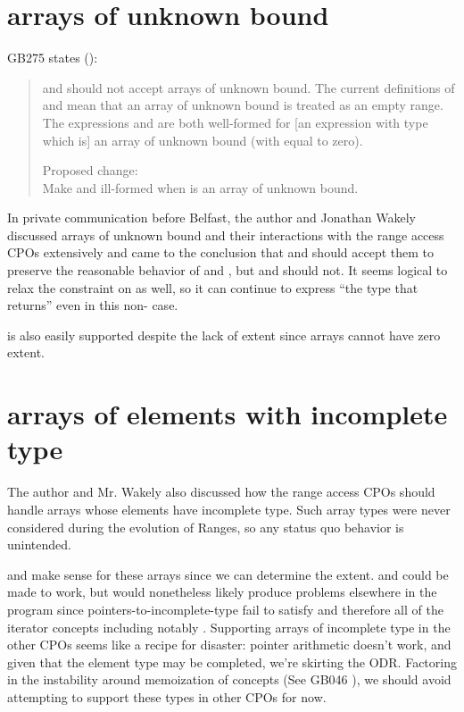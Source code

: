 \section{arrays of unknown bound}
GB275 states (\cite{GB275}):
\begin{quote}
 and  should not accept arrays of unknown bound.
The current definitions of  and 
mean that an array of unknown bound is treated as an empty range.
The expressions  and  are both well-formed
for [an expression  with type  which is] an array of unknown bound
(with  equal to zero).

Proposed change: \\
Make  and  ill-formed
when  is an array of unknown bound.
\end{quote}

In private communication before Belfast,
the author and Jonathan Wakely discussed arrays of unknown bound
and their interactions with the range access CPOs extensively
and came to the conclusion that
 and  should accept them
to preserve the reasonable behavior of  and ,
but  and  should not.
It seems logical to relax the  constraint on  as well,
so it can continue to express ``the type that  returns''
even in this non- case.

 is also easily supported
despite the lack of extent
since arrays cannot have zero extent.


\section{arrays of elements with incomplete type}

The author and Mr. Wakely also discussed
how the range access CPOs should handle
arrays whose elements have incomplete type.
Such array types were never considered during the evolution of Ranges,
so any status quo behavior is unintended.

 and  make sense for these arrays since we can determine the extent.
 and  could be made to work,
but would nonetheless likely produce problems elsewhere in the program since
pointers-to-incomplete-type fail to satisfy 
and therefore all of the iterator concepts including notably .
Supporting arrays of incomplete type in the other CPOs seems like a recipe for disaster:
pointer arithmetic doesn't work, and given that the element type may be completed, we're skirting the ODR.
Factoring in the instability around memoization of concepts (See GB046 \cite{GB046}),
we should avoid attempting to support these types in other CPOs for now.


